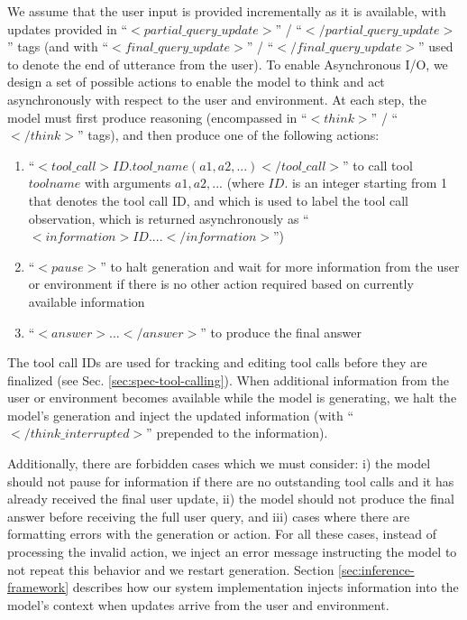 We assume that the user input is provided incrementally as it is available, with updates provided in ``$<partial\_query\_update>$'' / ``$</partial\_query\_update>$'' tags (and with ``$<final\_query\_update>$'' / ``$</final\_query\_update>$'' used to denote the end of utterance from the user).
To enable Asynchronous I/O, we design a set of possible actions to enable the model to think and act asynchronously with respect to the user and environment.
At each step, the model must first produce reasoning (encompassed in ``$<think>$'' / ``$</think>$'' tags), and then produce one of the following actions:
\begin{enumerate}
    \item ``$<tool\_call> ID. tool\_name(a1, a2, ...)</tool\_call>$'' to call tool $toolname$ with arguments $a1, a2, ...$ (where $ID.$ is an integer starting from 1 that denotes the tool call ID, and which is used to label the tool call observation, which is returned asynchronously as ``$<information> ID. ...</information>$'')
    \item ``$<pause>$'' to halt generation and wait for more information from the user or environment if there is no other action required based on currently available information
    \item ``$<answer> ... </answer>$'' to produce the final answer
\end{enumerate}

The tool call IDs are used for tracking and editing tool calls before they are finalized (see Sec. \ref{sec:spec-tool-calling}).
When additional information from the user or environment becomes available while the model is generating, we halt the model's generation and inject the updated information (with ``$</think\_interrupted>$'' prepended to the information).

Additionally, there are forbidden cases which we must consider: i) the model should not pause for information if there are no outstanding tool calls and it has already received the final user update, ii) the model should not produce the final answer before receiving the full user query, and iii) cases where there are formatting errors with the generation or action.
For all these cases, instead of processing the invalid action, we inject an error message instructing the model to not repeat this behavior and we restart generation.
Section \ref{sec:inference-framework} describes how our system implementation injects information into the model's context when updates arrive from the user and environment. 

